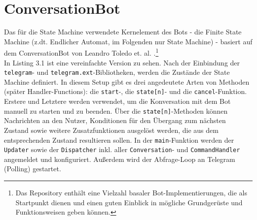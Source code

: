     \section{ConversationBot} \label{Grundlagen: ConversationBot}
        Das für die State Machine verwendete Kernelement des Bots - die Finite State Machine (z.dt. Endlicher Automat, im Folgenden nur \glqq State Machine\grqq) - basiert auf dem ConversationBot von Leandro Toledo et. al. \cite{conversationBot}.\footnote{Das Repository enthält eine Vielzahl basaler Bot-Implementierungen, die als Startpunkt dienen und einen guten Einblick in mögliche Grundgerüste und Funktionsweisen geben können.} \\
        In Listing 3.1 ist eine vereinfachte Version zu sehen. Nach der Einbindung der \verb|telegram|- und \verb|telegram.ext|-Bibliotheken, werden die Zustände der State Machine definiert. In diesem Setup gibt es drei angedeutete Arten von Methoden (später Handler-Functions): die \verb|start|-, die \verb|state[n]|- und die \verb|cancel|-Funktion. Erstere und Letztere werden verwendet, um die Konversation mit dem Bot manuell zu starten und zu beenden. Über die \verb|state[n]|-Methoden können Nachrichten an den Nutzer, Konditionen für den Übergang zum nächsten Zustand sowie weitere Zusatzfunktionen ausgelöst werden, die aus dem entsprechenden Zustand resultieren sollen. 
        In der \verb|main|-Funktion werden der \verb|Updater| sowie der \verb|Dispatcher| inkl. aller \verb|Conversation|- und \verb|CommandHandler| angemeldet und konfiguriert. Außerdem wird der Abfrage-Loop an Telegram (Polling) gestartet. 
        
